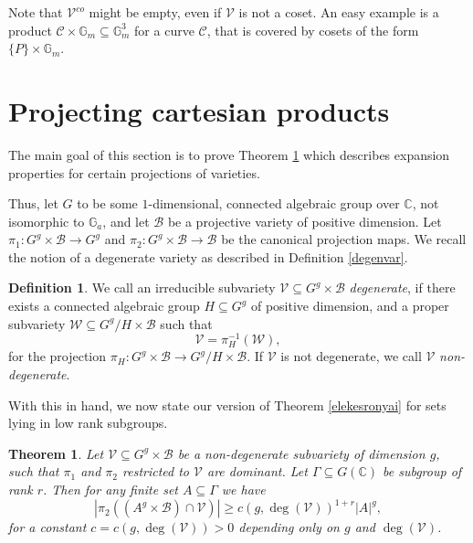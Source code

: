 \documentclass[12pt, reqno]{amsart}
\newcommand{\C}{\mathbb{C}}
\newtheorem{thm}[theorem]{Theorem}
\theoremstyle{remark}
\theoremstyle{definition}
\newtheorem{definition}[theorem]{Definition}
\numberwithin{equation}{section}
\begin{document}
Note that $\mathcal{V}^{co}$ might be empty, even if $\mathcal{V}$ is not a coset. An easy example is a product $\mathcal{C} \times \mathbb{G}_m \subseteq \mathbb{G}_m^3$ for a curve $\mathcal{C}$, that is covered by cosets of the form $\{P\}\times \mathbb{G}_m$. 











\section{ Projecting cartesian products} \label{pcp}


The main goal of this section is to prove Theorem \ref{projections} which describes expansion properties for certain projections of varieties. 

Thus, let $G$ to be some $1$-dimensional, connected algebraic group over $\mathbb{C}$, not isomorphic to $\mathbb{G}_a$, and let $\mathcal{B}$ be a projective variety of positive dimension. Let $\pi_1 : G^g \times \mathcal{B} \to G^g$ and $\pi_2: G^g \times \mathcal{B} \to \mathcal{B}$ be the canonical projection maps.  We recall the notion of a degenerate variety as described in Definition \ref{degenvar}. 




\begin{definition}
We call an irreducible subvariety $\mathcal{V} \subseteq  G^g \times \mathcal{B}$ \emph{degenerate}, if there exists a connected algebraic group $H \subseteq G^g$ of positive dimension, and a proper subvariety $\mathcal{W} \subseteq G^g/H\times \mathcal{B} $ such that 
$$\mathcal{V} = \pi_H^{-1}(\mathcal{W}), $$
for the projection $\pi_H: G^g \times \mathcal{B} \rightarrow G^g/H\times \mathcal{B}$. 
    If $\mathcal{V}$ is not degenerate, we call $\mathcal{V}$ \textit{non-degenerate}. 
\end{definition} 

With this in hand, we now state our version of Theorem \ref{elekesronyai} for sets lying in low rank subgroups.

\begin{thm}\label{projections}
Let $\mathcal{V} \subseteq G^g\times \mathcal{B}$ be a non-degenerate subvariety of dimension $g$, such that $\pi_1$ and $\pi_2$ restricted to $\mathcal{V}$ are dominant. Let $\Gamma \subseteq G(\C)$ be subgroup of rank $r$. Then for any finite set $A \subseteq \Gamma$ we have
$$|\pi_2( (A^g\times \mathcal{B}) \cap \mathcal{V})| \geq c(g,\deg(\mathcal{V}))^{1 + r}|A|^g,$$
for a constant $c = c(g,\deg(\mathcal{V})) >0 $ depending only on $g$ and $\deg(\mathcal{V})$. 
\end{thm}
\end{document}
